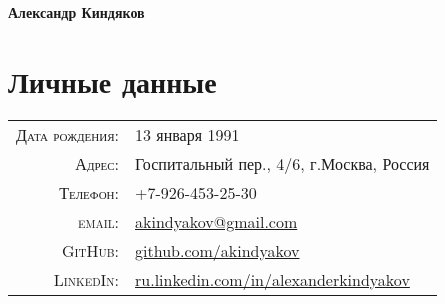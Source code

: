 \documentclass[a4paper, 10pt]{article}
\begin{document}
{\Large\textbf{Александр Киндяков}}
\newline

\section{Личные данные}
\begin{tabular}{rl}
    \textsc{Дата рождения:} & 13 января 1991 \\
    \textsc{Адрес:}         & Госпитальный пер., 4/6, г.Москва, Россия \\
    \textsc{Телефон:}       & +7-926-453-25-30 \\
    \textsc{email:}         & \href{mailto:akindyakov@gmail.com}{akindyakov@gmail.com} \\
    \textsc{GitHub:}        & \href{https://github.com/akindyakov}{github.com/akindyakov} \\
    \textsc{LinkedIn:}      & \href{http://ru.linkedin.com/in/alexanderkindyakov}{ru.linkedin.com/in/alexanderkindyakov} \\
\end{tabular}

\end{document}
